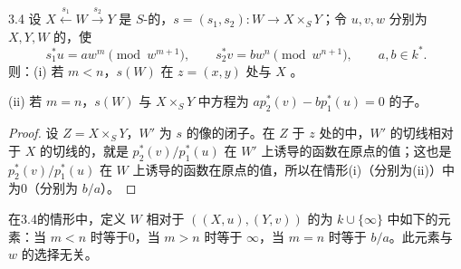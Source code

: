 \begin{SGAresult}{}{3.4}
设 $X\xleftarrow{s_1}W\xrightarrow{s_2}Y$ 是 $S$-的，$s=(s_1,s_2):W\to X\times_S Y$；令 $u,v,w$ 分别为 $X,Y,W$ 的，使
\[
 s_1^*u=aw^m\pmod{w^{m+1}},\qquad
 s_2^*v=bw^n\pmod{w^{n+1}},\qquad a,b\in k^*.
\]
则：(i) 若 $m<n$，$s(W)$ 在 $z=(x,y)$ 处与 $X$ 。

(ii) 若 $m=n$，$s(W)$ 与 $X\times_S Y$ 中方程为 $ap_2^*(v)-bp_1^*(u)=0$ 的子。
\end{SGAresult}
\begin{proof}
设 $Z=X\times_S Y$，$W'$ 为 $s$ 的像的闭子。在 $Z$ 于 $z$ 处的中，$W'$ 的切线相对于 $X$ 的切线的，就是 $p_2^*(v)/p_1^*(u)$ 在 $W'$ 上诱导的函数在原点的值；这也是 $p_2^*(v)/p_1^*(u)$ 在 $W$ 上诱导的函数在原点的值，所以在情形(i)（分别为(ii)）中为0（分别为 $b/a$）。
\end{proof}
在3.4的情形中，定义 $W$ 相对于 $((X,u),(Y,v))$ 的为 $k\cup\{\infty\}$ 中如下的元素：当 $m<n$ 时等于0，当 $m>n$ 时等于 $\infty$，当 $m=n$ 时等于 $b/a$。此元素与 $w$ 的选择无关。

